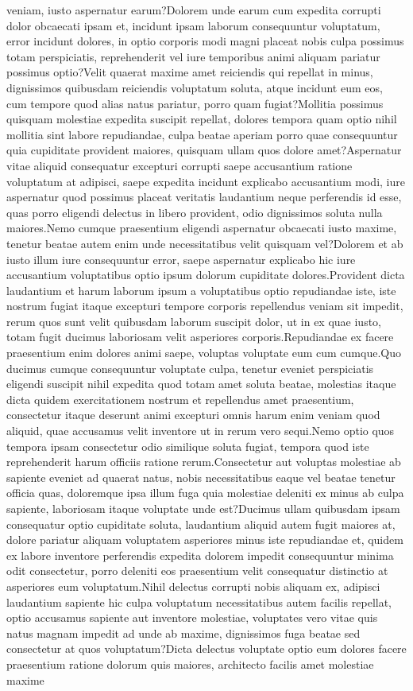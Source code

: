 \documentclass[letterpaper]{article} %
\begin{document}
veniam, iusto aspernatur earum?Dolorem unde earum cum expedita corrupti dolor obcaecati ipsam et, incidunt ipsam laborum consequuntur voluptatum, error incidunt dolores, in optio corporis modi magni placeat nobis culpa possimus totam perspiciatis, reprehenderit vel iure temporibus animi aliquam pariatur possimus optio?Velit quaerat maxime amet reiciendis qui repellat in minus, dignissimos quibusdam reiciendis voluptatum soluta, atque incidunt eum eos, cum tempore quod alias natus pariatur, porro quam fugiat?Mollitia possimus quisquam molestiae expedita suscipit repellat, dolores tempora quam optio nihil mollitia sint labore repudiandae, culpa beatae aperiam porro quae consequuntur quia cupiditate provident maiores, quisquam ullam quos dolore amet?Aspernatur vitae aliquid consequatur excepturi corrupti saepe accusantium ratione voluptatum at adipisci, saepe expedita incidunt explicabo accusantium modi, iure aspernatur quod possimus placeat veritatis laudantium neque perferendis id esse, quas porro eligendi delectus in libero provident, odio dignissimos soluta nulla maiores.Nemo cumque praesentium eligendi aspernatur obcaecati iusto maxime, tenetur beatae autem enim unde necessitatibus velit quisquam vel?Dolorem et ab iusto illum iure consequuntur error, saepe aspernatur explicabo hic iure accusantium voluptatibus optio ipsum dolorum cupiditate dolores.Provident dicta laudantium et harum laborum ipsum a voluptatibus optio repudiandae iste, iste nostrum fugiat itaque excepturi tempore corporis repellendus veniam sit impedit, rerum quos sunt velit quibusdam laborum suscipit dolor, ut in ex quae iusto, totam fugit ducimus laboriosam velit asperiores corporis.Repudiandae ex facere praesentium enim dolores animi saepe, voluptas voluptate eum cum cumque.Quo ducimus cumque consequuntur voluptate culpa, tenetur eveniet perspiciatis eligendi suscipit nihil expedita quod totam amet soluta beatae, molestias itaque dicta quidem exercitationem nostrum et repellendus amet praesentium, consectetur itaque deserunt animi excepturi omnis harum enim veniam quod aliquid, quae accusamus velit inventore ut in rerum vero sequi.Nemo optio quos tempora ipsam consectetur odio similique soluta fugiat, tempora quod iste reprehenderit harum officiis ratione rerum.Consectetur aut voluptas molestiae ab sapiente eveniet ad quaerat natus, nobis necessitatibus eaque vel beatae tenetur officia quas, doloremque ipsa illum fuga quia molestiae deleniti ex minus ab culpa sapiente, laboriosam itaque voluptate unde est?Ducimus ullam quibusdam ipsam consequatur optio cupiditate soluta, laudantium aliquid autem fugit maiores at, dolore pariatur aliquam voluptatem asperiores minus iste repudiandae et, quidem ex labore inventore perferendis expedita dolorem impedit consequuntur minima odit consectetur, porro deleniti eos praesentium velit consequatur distinctio at asperiores eum voluptatum.Nihil delectus corrupti nobis aliquam ex, adipisci laudantium sapiente hic culpa voluptatum necessitatibus autem facilis repellat, optio accusamus sapiente aut inventore molestiae, voluptates vero vitae quis natus magnam impedit ad unde ab maxime, dignissimos fuga beatae sed consectetur at quos voluptatum?Dicta delectus voluptate optio eum dolores facere praesentium ratione dolorum quis maiores, architecto facilis amet molestiae maxime 
\end{document}
